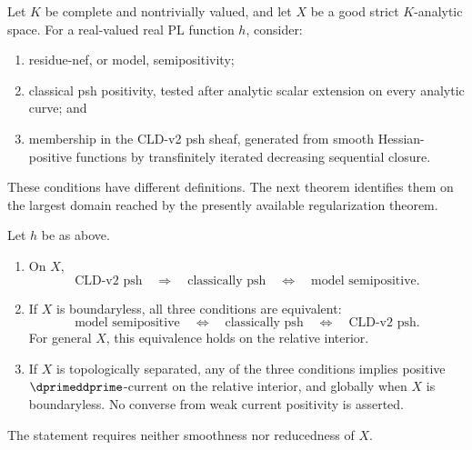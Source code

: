 Let $K$ be complete and nontrivially valued, and let $X$ be a good strict
$K$-analytic space.  For a real-valued real PL function $h$, consider:
\begin{enumerate}
\item residue-nef, or model, semipositivity;
\item classical psh positivity, tested after analytic scalar extension on
      every analytic curve; and
\item membership in the CLD-v2 psh sheaf, generated from smooth
      Hessian-positive functions by transfinitely iterated decreasing
      sequential closure.
\end{enumerate}
These conditions have different definitions.  The next theorem
identifies them on the largest domain reached by the presently available
regularization theorem.

\begin{theorem}\label{thm:verified-pl-psh-equivalence}
Let \(h\) be as above.
\begin{enumerate}
\item On \(X\),
\[
 \text{CLD-v2 psh}
 \quad\Longrightarrow\quad
 \text{classically psh}
 \quad\Longleftrightarrow\quad
 \text{model semipositive}.
\]
\item If \(X\) is boundaryless, all three conditions are equivalent:
\[
 \text{model semipositive}
 \quad\Longleftrightarrow\quad
 \text{classically psh}
 \quad\Longleftrightarrow\quad
 \text{CLD-v2 psh}.
\tag{69.38}\label{eq:verified-pl-psh-equivalence}
\]
For general \(X\), this equivalence holds on the relative interior.
\item If \(X\) is topologically separated, any of the three conditions
implies positive \(\dprimeddprime\)-current on the relative interior, and
globally when \(X\) is boundaryless.  No converse from weak current
positivity is asserted.
\end{enumerate}
The statement requires neither smoothness nor reducedness of \(X\).
\end{theorem}

